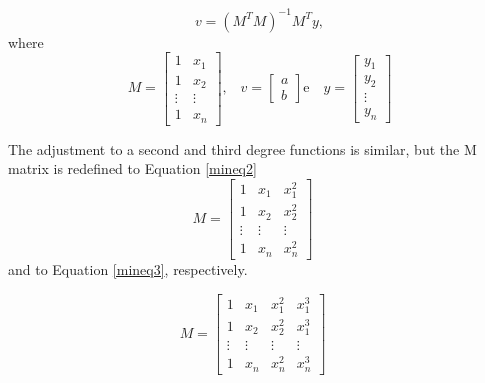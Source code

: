 \documentclass[10pt, conference, compsocconf]{IEEEtran}
\begin{document}
{\begin{equation}
		v =( M^{T}M)^{-1}M^{T}y,
	\label{mineq1}
	\end{equation}
	where
	\begin{equation}
	M = \left[\begin{array}{cc}
               	1 & x_{1} \\
               	1 & x_{2}  \\
		\vdots & \vdots  \\
		1 & x_{n}
          	         \end{array}\right] \mbox{,} \quad
	v = \left[\begin{array}{c}
               	a \\
               	b  
          	         \end{array}\right] \mbox{e} \quad
	y = \left[\begin{array}{c}
               	y_{1} \\
               	y_{2}  \\
	 \vdots  \\
		y_{n}
          	         \end{array}\right] 	
	\label{variaveis}
	\end{equation}
	
The adjustment to a second and third degree functions is similar, but the M matrix
is redefined to Equation \ref{mineq2} 
\begin{equation}
	M = \left[\begin{array}{ccc}
               	1 & x_{1} & x_{1}^{2} \\
               	1 & x_{2}  & x_{2}^{2}\\
		\vdots & \vdots & \vdots \\
		1 & x_{n} & x_{n}^{2}
          	         \end{array}\right] \quad
	\label{mineq2}
	\end{equation}
	and to Equation \ref{mineq3}, respectively. 

		\begin{equation}
	M = \left[\begin{array}{cccc}
               	1 & x_{1} & x_{1}^{2} & x_{1}^{3} \\
               	1 & x_{2}  & x_{2}^{2} & x_{1}^{3}\\
		\vdots & \vdots  & \vdots & \vdots\\
		1 & x_{n} &  x_{n}^{2} & x_{n}^{3}
          	         \end{array}\right] \quad
	\label{mineq3}
	\end{equation}
	
}
\end{document}
